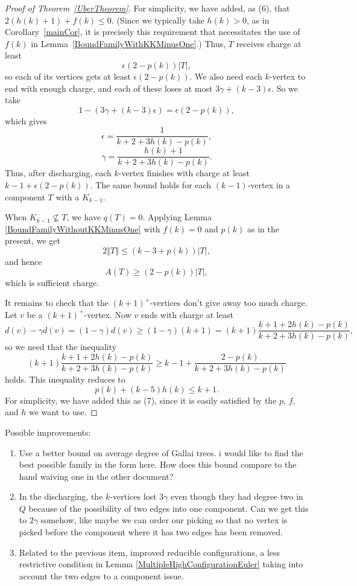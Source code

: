 \documentclass[12pt]{article}
\theoremstyle{plain}
\theoremstyle{definition}
\theoremstyle{remark}
\newcommand{\card}[1]{\left|#1\right|}
\newcommand{\size}[1]{\left\Vert#1\right\Vert}
\newcommand{\parens}[1]{\left( #1 \right)}
\begin{document}
\begin{proof}[Proof of Theorem~\ref{UberTheorem}]
%
For simplicity, we have added, as (6), that $2(h(k) + 1) + f(k) \le 0$.  (Since we typically take $h(k) > 0$, as in Corollary~\ref{mainCor}, it is precisely this requirement that necessitates the use of $f(k)$ in Lemma~\ref{BoundFamilyWithKKMinusOne}.)  Thus, $T$ receives charge at least
\[\epsilon\parens{2-p(k)}\card{T},\]
so each of its vertices gets at least $\epsilon(2-p(k))$.
We also need each $k$-vertex to end with enough charge, and each of these loses at most $3\gamma+(k-3)\epsilon$.  So we take
\[1 - (3\gamma + (k-3)\epsilon) = \epsilon\parens{2-p(k)},\]
which gives
\[\epsilon = \frac{1}{k+2 + 3h(k) - p(k)},\]
\[\gamma = \frac{h(k)+1}{k+2 + 3h(k) - p(k)}.\]
Thus, after discharging, each $k$-vertex finishes with charge at least $k-1+\epsilon(2-p(k))$.  The same bound holds for each $(k-1)$-vertex in a component $T$ with a $K_{k-1}$.

When $K_{k-1} \not \subseteq T$, we have $q(T) = 0$.  Applying Lemma \ref{BoundFamilyWithoutKKMinusOne} with $f(k) = 0$ and $p(k)$ as in the present, we get 
\[2\size{T} \le (k-3 + p(k))\card{T},\]
and hence
\[A(T) \ge (2-p(k))\card{T},\]
which is sufficient charge.

It remains to check that the $(k+1)^+$-vertices don't give away too much charge.  Let $v$ be a $(k+1)^+$-vertex. Now $v$ ends with charge at least
\[d(v) - \gamma d(v) = (1-\gamma)d(v) \ge (1-\gamma)(k+1) = (k+1)\frac{k+1 + 2h(k) - p(k)}{k+2 + 3h(k) - p(k)},\]
so we need that the inequality
\[(k+1)\frac{k+1 + 2h(k) - p(k)}{k+2 + 3h(k) - p(k)} \ge k-1 + \frac{2-p(k)}{k+2 + 3h(k) - p(k)}\]
holds.  This inequality reduces to
\[p(k) + (k-5)h(k) \le k+1.\]
For simplicity, we have added this as (7), since it is easily satisfied by the $p$, $f$, and $h$ we want to use.
\end{proof}



Possible improvements:

\begin{enumerate}
	\item Use a better bound on average degree of Gallai trees.  i would like to find the best possible family in the form here.  How does this bound compare to the hand waiving one in the other document?
	\item In the discharging, the $k$-vertices lost $3\gamma$ even though they had degree two in $Q$ because of the possibility of two edges into one component.  Can we get this to $2\gamma$ somehow, like maybe we can order our picking so that no vertex is picked before the component where it has two edges has been removed.   
	\item Related to the previous item, improved reducible configurations, a less restrictive condition in Lemma \ref{MultipleHighConfigurationEuler} taking into account the two edges to a component issue.
\end{enumerate}
\end{document}
